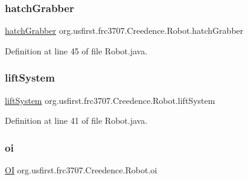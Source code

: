\subsubsection{\texorpdfstring{hatchGrabber}{hatchGrabber}}
{\footnotesize\ttfamily \mbox{\hyperlink{classorg_1_1usfirst_1_1frc3707_1_1_creedence_1_1subsystems_1_1hatch_grabber}{hatch\+Grabber}} org.\+usfirst.\+frc3707.\+Creedence.\+Robot.\+hatch\+Grabber\hspace{0.3cm}{\ttfamily [static]}}



Definition at line 45 of file Robot.\+java.

\mbox{\label{classorg_1_1usfirst_1_1frc3707_1_1_creedence_1_1_robot_a459a2a39c6ae9af4e6aa11a64dd7e524}} 
\subsubsection{\texorpdfstring{liftSystem}{liftSystem}}
{\footnotesize\ttfamily \mbox{\hyperlink{classorg_1_1usfirst_1_1frc3707_1_1_creedence_1_1subsystems_1_1lift_system}{lift\+System}} org.\+usfirst.\+frc3707.\+Creedence.\+Robot.\+lift\+System\hspace{0.3cm}{\ttfamily [static]}}



Definition at line 41 of file Robot.\+java.

\mbox{\label{classorg_1_1usfirst_1_1frc3707_1_1_creedence_1_1_robot_a96f7c8fc21b7333a03f7cab88957d9bf}} 
\subsubsection{\texorpdfstring{oi}{oi}}
{\footnotesize\ttfamily \mbox{\hyperlink{classorg_1_1usfirst_1_1frc3707_1_1_creedence_1_1_o_i}{OI}} org.\+usfirst.\+frc3707.\+Creedence.\+Robot.\+oi\hspace{0.3cm}{\ttfamily [static]}}



